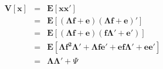 \begin{eqnarray*}
	\bm{V}\left[ \bm{x} \right] &=& \bm{E}\left[ \bm{xx'}\right]\\
	&=& \bm{E}\left[ (\bm{\Lambda f}+\bm{e}) (\bm{\Lambda f}+\bm{e})' \right] \\
	&=& \bm{E}\left[ (\bm{\Lambda f}+\bm{e}) (\bm{f \Lambda' }+\bm{e'}) \right] \\
	&=& \bm{E}\left[ \bm{ \Lambda f^2 \Lambda' + \Lambda f e'  + ef\Lambda ' + ee' } \right] \\
	&=& \bm{\Lambda \Lambda'} + \Psi \\
\end{eqnarray*}
